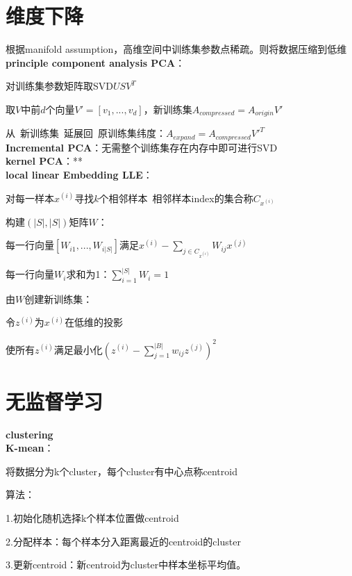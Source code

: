 \documentclass[UTF8]{ctexart}
\begin{document}
\section{维度下降}
\noindent 根据manifold assumption，高维空间中训练集参数点稀疏。则将数据压缩到低维\\
\textbf{principle component analysis PCA}：

  对训练集参数矩阵取SVD$USV^T$

  取$V$中前$d$个向量$V' = [v_1, ..., v_d]$，新训练集$A_{compressed} = A_{origin}V'$
  
  从\ 新训练集\ 延展回\ 原训练集纬度：$A_{expand} = A_{compressed}V'^T$\\
\textbf{Incremental PCA}：无需整个训练集存在内存中即可进行SVD\\
\textbf{kernel PCA}：**\\
\textbf{local linear Embedding LLE}：
  
  对每一样本$x^{(i)}$寻找$k$个相邻样本\ 相邻样本index的集合称$C_{x^{(i)}}$
  
  构建$(|S|, |S|)$矩阵$W$：
  
  \quad 每一行向量$[W_{i1}, ..., W_{i|S|}]$满足$x^{(i)} - \sum_{j \in C_{x^{(i)}}} W_{ij}x^{(j)}$
  
  \quad 每一行向量$W_i$求和为1：$\sum_{i=1}^{|S|}W_i = 1$

  由$W$创建新训练集：

  \quad 令$z^{(i)}$为$x^{(i)}$在低维的投影

  \quad 使所有$z^{(i)}$满足最小化$(z^{(i)} - \sum_{j=1}^{|B|}w_{ij}z^{(j)})^2$

\section{无监督学习}
\noindent \textbf{clustering}\\
\textbf{K-mean}：

  将数据分为k个cluster，每个cluster有中心点称centroid
  
  算法：
  
  \quad 1.初始化随机选择k个样本位置做centroid

  \quad 2.分配样本：每个样本分入距离最近的centroid的cluster

  \quad 3.更新centroid：新centroid为cluster中样本坐标平均值。
  
\end{document}
